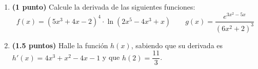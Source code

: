 
\begin{enumerate}[label=\alph*)]
  \item \textbf{(1 punto)} Calcule la derivada de las siguientes funciones:
  \[
  f(x)=(5x^3+4x-2)^4\cdot\ln(2x^5-4x^3+x)
  \qquad g(x)=\frac{e^{3x^2-5x}}{(6x^2+2)^3}
  \]
  \item \textbf{(1.5 puntos)} Halle la función $h(x)$, sabiendo que su
  derivada es $h'(x)=4x^3+x^2-4x-1$ y que $h(2)=\dfrac{11}{3}$.
\end{enumerate}
